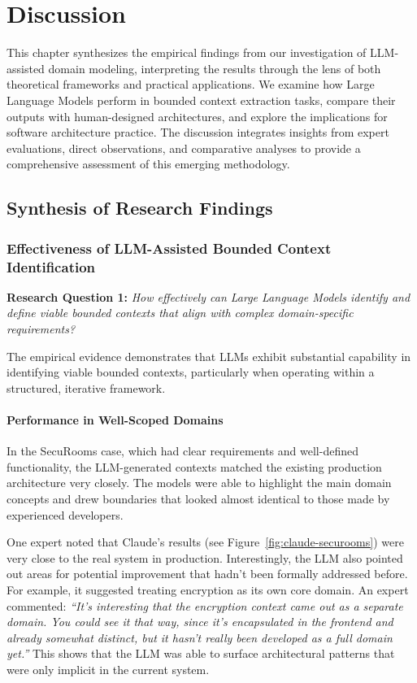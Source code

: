 \chapter{Discussion}\label{chapter:discussion}

This chapter synthesizes the empirical findings from our investigation of LLM-assisted domain modeling, interpreting the results through the lens of both theoretical frameworks and practical applications. We examine how Large Language Models perform in bounded context extraction tasks, compare their outputs with human-designed architectures, and explore the implications for software architecture practice. The discussion integrates insights from expert evaluations, direct observations, and comparative analyses to provide a comprehensive assessment of this emerging methodology.

\section{Synthesis of Research Findings}

\subsection{Effectiveness of LLM-Assisted Bounded Context Identification}

\textbf{Research Question 1:} \textit{How effectively can Large Language Models identify and define viable bounded contexts that align with complex domain-specific requirements?}

The empirical evidence demonstrates that LLMs exhibit substantial capability in identifying viable bounded contexts, particularly when operating within a structured, iterative framework.

\subsubsection{Performance in Well-Scoped Domains}
In the SecuRooms case, which had clear requirements and well-defined functionality, the LLM-generated contexts matched the existing production architecture very closely. The models were able to highlight the main domain concepts and drew boundaries that looked almost identical to those made by experienced developers.

One expert noted that Claude's results (see Figure~\ref{fig:claude-securooms}) were very close to the real system in production. Interestingly, the LLM also pointed out areas for potential improvement that hadn't been formally addressed before. For example, it suggested treating encryption as its own core domain. An expert commented: \textit{“It's interesting that the encryption context came out as a separate domain. You could see it that way, since it's encapsulated in the frontend and already somewhat distinct, but it hasn't really been developed as a full domain yet.”} This shows that the LLM was able to surface architectural patterns that were only implicit in the current system.

